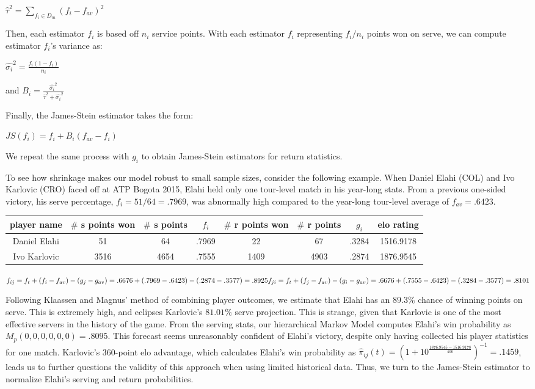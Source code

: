 \documentclass[11pt]{article}
\begin{document}
$\hat{\tau}^2 = \sum_{f_i \in D_m} (f_i-f_{av})^2$

Then, each estimator $f_i$ is based off $n_i$ service points. With each estimator $f_i$ representing $f_i/n_i$ points won on serve, we can compute estimator $f_i$'s variance as:

$\hat{\sigma_i}^2 = \frac{f_i(1-f_i)}{n_i}$

and $B_i = \frac{\hat{\sigma_i}^2}{\hat{\tau}^2+\hat{\sigma_i}^2} $

Finally, the James-Stein estimator takes the form: 

$JS(f_i) = f_i + B_i(f_{av}-f_i)$

We repeat the same process with $g_i$ to obtain James-Stein estimators for return statistics.

To see how shrinkage makes our model robust to small sample sizes, consider the following example. When Daniel Elahi (COL) and Ivo Karlovic (CRO) faced off at ATP Bogota 2015, Elahi held only one tour-level match in his year-long stats. From a previous one-sided victory, his serve percentage, $f_i=51/64=.7969$, was abnormally high compared to the year-long tour-level average of $f_{av}=.6423$. 


\begin{center}
\begin{tabular}{ |c|c|c|c|c|c|c|c| } 
 \hline
 player name & $\#$ s points won & $\#$ s points
 & $f_i$ &$\#$ r points won & $\#$ r points & $g_i$ & elo rating \\ 
 \hline
 Daniel Elahi & 51 & 64 & .7969 & 22 & 67 & .3284 & 1516.9178 
 \\
 \hline
 Ivo Karlovic & 3516 & 4654 & .7555 & 1409 & 4903 & .2874 & 1876.9545 \\ 
 \hline
\end{tabular}
\end{center}

$f_{ij} = f_t + (f_i-f_{av})-(g_j-g_{av}) = .6676 + (.7969-.6423) - (.2874-.3577) = .8925
\newline
f_{ji} = f_t + (f_j-f_{av})-(g_i-g_{av}) = .6676 + (.7555-.6423) - (.3284-.3577) = .8101$

Following Klaassen and Magnus' method of combining player outcomes, we estimate that Elahi has an $89.3\%$ chance of winning points on serve. This is extremely high, and eclipses Karlovic's $81.01\%$ serve projection. This is strange, given that Karlovic is one of the most effective servers in the history of the game. From the serving stats, our hierarchical Markov Model computes Elahi's win probability as $M_p(0,0,0,0,0,0) = .8095$. This forecast seems unreasonably confident of Elahi's victory, despite only having collected his player statistics for one match. Karlovic's 360-point elo advantage, which calculates Elahi's win probability as $\hat{\pi}_{ij}(t) = (1+10^\frac{1876.9545 - 1516.9178}{400})^{-1} = .1459$, leads us to further questions the validity of this approach when using limited historical data. Thus, we turn to the James-Stein estimator to normalize Elahi's serving and return probabilities.
\end{document}
